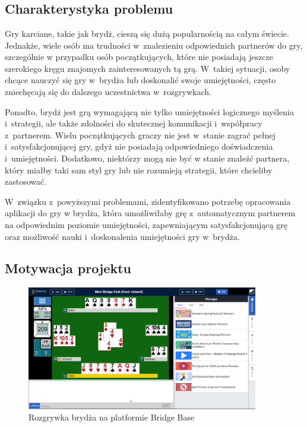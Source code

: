 \chapter{\ChapterTitleProjectVision}
\label{sec:cel-wizja}


\section{Charakterystyka problemu}

Gry karciane, takie jak brydż, cieszą się dużą popularnością na całym świecie.
Jednakże, wiele osób ma trudności w~znalezieniu odpowiednich partnerów do gry,
szczególnie w przypadku osób początkujących, które nie posiadają jeszcze
szerokiego kręgu znajomych zainteresowanych tą grą. W~takiej sytuacji, osoby
chcące nauczyć się gry w~brydża lub doskonalić swoje umiejętności, często
zniechęcają się do dalszego uczestnictwa w~rozgrywkach.

Ponadto, brydż jest grą wymagającą nie tylko umiejętności logicznego myślenia
i~strategii, ale także zdolności do skutecznej komunikacji i~współpracy
z~partnerem. Wielu początkujących graczy nie jest w~stanie zagrać pełnej
i~satysfakcjonującej gry, gdyż nie posiadają odpowiedniego doświadczenia
i~umiejętności. Dodatkowo, niektórzy mogą nie być w stanie znaleźć
partnera, który miałby taki sam styl gry lub nie rozumieją strategii,
które chcieliby zastosować.

W~związku z~powyższymi problemami, zidentyfikowano potrzebę opracowania
aplikacji do gry w brydża, która umożliwiłaby grę z~automatycznym
partnerem na odpowiednim poziomie umiejętności, zapewniającym satysfakcjonującą
grę oraz możliwość nauki i~doskonalenia umiejętności gry w~brydża.


\section{Motywacja projektu}

\begin{figure}
  \centering
  \includegraphics[width=0.9\textwidth]{img/brydz-platformy/bridgebase.png}
  \caption{Rozgrywka brydża na platformie Bridge Base}
  \label{fig:bridge-base}
\end{figure}

